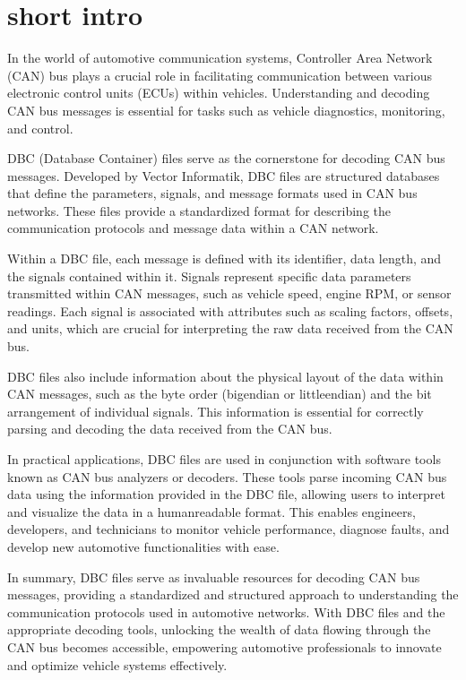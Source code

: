 \documentclass[letterpaper,10pt,english]{sphinxmanual}
\begin{document}
\section{short intro}
\label{\detokenize{dbc:short-intro}}
\sphinxAtStartPar
In the world of automotive communication systems, Controller Area Network (CAN) bus plays a crucial role in facilitating communication between various electronic control units (ECUs) within vehicles. Understanding and decoding CAN bus messages is essential for tasks such as vehicle diagnostics, monitoring, and control.

\sphinxAtStartPar
DBC (Database Container) files serve as the cornerstone for decoding CAN bus messages. Developed by Vector Informatik, DBC files are structured databases that define the parameters, signals, and message formats used in CAN bus networks. These files provide a standardized format for describing the communication protocols and message data within a CAN network.

\sphinxAtStartPar
Within a DBC file, each message is defined with its identifier, data length, and the signals contained within it. Signals represent specific data parameters transmitted within CAN messages, such as vehicle speed, engine RPM, or sensor readings. Each signal is associated with attributes such as scaling factors, offsets, and units, which are crucial for interpreting the raw data received from the CAN bus.

\sphinxAtStartPar
DBC files also include information about the physical layout of the data within CAN messages, such as the byte order (big\sphinxhyphen{}endian or little\sphinxhyphen{}endian) and the bit arrangement of individual signals. This information is essential for correctly parsing and decoding the data received from the CAN bus.

\sphinxAtStartPar
In practical applications, DBC files are used in conjunction with software tools known as CAN bus analyzers or decoders. These tools parse incoming CAN bus data using the information provided in the DBC file, allowing users to interpret and visualize the data in a human\sphinxhyphen{}readable format. This enables engineers, developers, and technicians to monitor vehicle performance, diagnose faults, and develop new automotive functionalities with ease.

\sphinxAtStartPar
In summary, DBC files serve as invaluable resources for decoding CAN bus messages, providing a standardized and structured approach to understanding the communication protocols used in automotive networks. With DBC files and the appropriate decoding tools, unlocking the wealth of data flowing through the CAN bus becomes accessible, empowering automotive professionals to innovate and optimize vehicle systems effectively.
\end{document}
